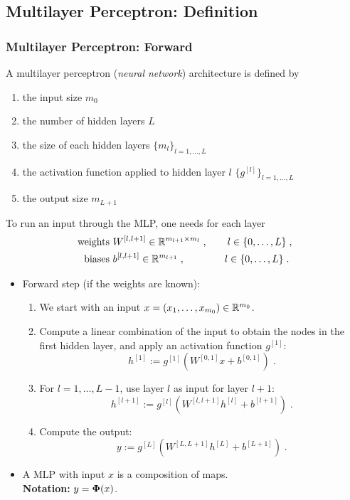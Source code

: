 \documentclass[10pt,hyperref={pdfpagelabels=false}]{beamer}
\begin{document}
\subsection{Multilayer Perceptron: Definition}
\begin{frame}[allowframebreaks]
    \frametitle{Multilayer Perceptron: Forward}
        \centering
        \framebreak
        \begin{definition}
            A multilayer perceptron (\emph{neural network}) architecture is defined by
            \begin{enumerate}
                \item the input size $m_0$
                \item the number of hidden layers $L$
                \item the size of each hidden layers $\{m_l\}_{l=1,\dots,L}$
                \item the activation function applied to hidden layer $l$ $\{g^{[l]}\}_{l=1,\dots,L}$
                \item the output size $m_{L+1}$
            \end{enumerate}
            To run an input through the MLP, one needs for each layer
            \begin{equation*}
                \begin{split}
                    \text{weights }& W^{[l, l+1]}\in \mathbb{R}^{m_{l+1}\times m_l}
                    \;,\qquad l\in\{0, \dots, L\}
                    \;,\\
                    \text{ biases }& b^{[l, l+1]} \in \mathbb{R}^{m_{l+1}}
                    \;,\qquad\qquad l\in\{0, \dots, L\}
                    \;.
                \end{split}
            \end{equation*}
        \end{definition}
    \framebreak
    \begin{itemize}
        \item Forward step (if the weights are known):
        \begin{enumerate}
            \item We start with an input $x=(x_1,\dots,x_{m_0})\in \mathbb{R}^{m_0}$.
            \item Compute a linear combination of the input to obtain the nodes in the first hidden layer, and apply an activation function $g^{[1]}$: $$h^{[1]}:=g^{[1]}\left(W^{[0,1]}x+b^{[0,1]}\right)\;.$$
            \item For $l=1,\dots,L-1$, use layer $l$ as input for layer $l+1$:
            $$h^{[l+1]}:=g^{[l]}\left(W^{[l,l+1]}h^{[l]}+b^{[l+1]}\right)\;.$$
            \item Compute the output:
            $$y:=g^{[L]}\left(W^{[L,L+1]}h^{[L]}+b^{[L+1]}\right)\;.$$
        \end{enumerate}
        \item A MLP with input $x$ is a composition of maps. \\
        {\bf Notation:} $y=\boldsymbol{\Phi}(x)$.
    \end{itemize}
\end{frame}
\end{document}
